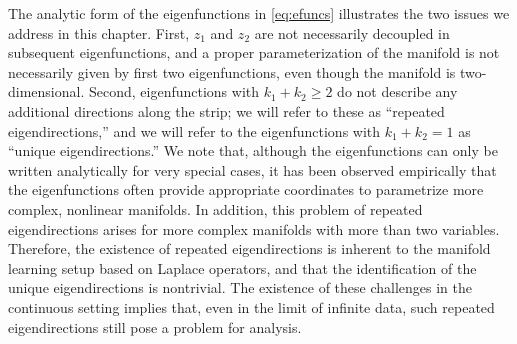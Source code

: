 %
The analytic form of the eigenfunctions in \eqref{eq:efuncs} illustrates the two issues we address in this chapter.
%
First, $z_1$ and $z_2$ are not necessarily decoupled in subsequent eigenfunctions, and a proper parameterization of the manifold is not necessarily given by first two eigenfunctions, even though the manifold is two-dimensional.
%
Second, eigenfunctions with $k_1+k_2 \ge 2$ do not describe any additional directions along the strip; we will refer to these as ``repeated eigendirections,'' and we will refer to the eigenfunctions with $k_1+k_2 =1$ as ``unique eigendirections.'' 
%
We note that, although the eigenfunctions can only be written analytically for very special cases, it has been observed empirically that the eigenfunctions often provide appropriate coordinates to parametrize more complex, nonlinear manifolds.
%
In addition, this problem of repeated eigendirections arises for more complex manifolds with more than two variables.
%
Therefore, the existence of repeated eigendirections is inherent to the manifold learning setup based on Laplace operators, and that the identification of the unique eigendirections is nontrivial.
%
The existence of these challenges in the continuous setting implies that, even in the limit of infinite data, such repeated eigendirections still pose a problem for analysis.


